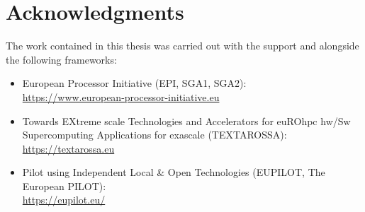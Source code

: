 \section{Acknowledgments}
The work contained in this thesis was carried out with the support and alongside  the following  frameworks:
\begin{itemize}
    \item European Processor Initiative (EPI, SGA1, SGA2): \\\url{https://www.european-processor-initiative.eu}
    \item Towards EXtreme scale Technologies and Accelerators for euROhpc hw/Sw Supercomputing Applications for exascale (TEXTAROSSA): \\\url{https://textarossa.eu}
    \item Pilot using Independent Local \& Open Technologies (EUPILOT, The European PILOT): \\\url{https://eupilot.eu/}
\end{itemize}